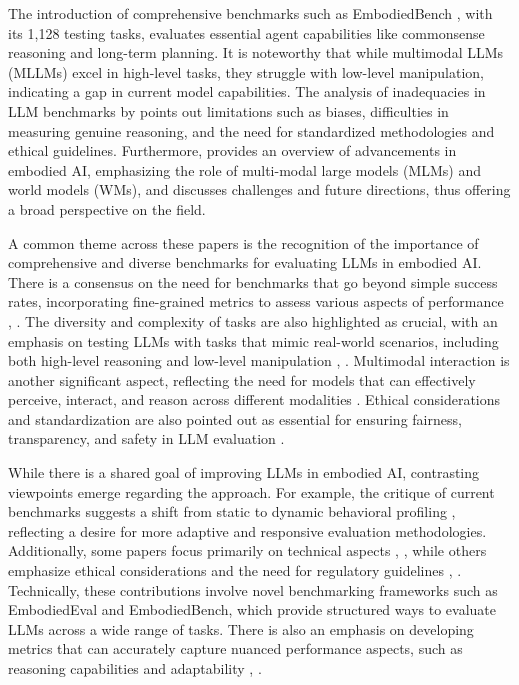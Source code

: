 \documentclass[conference]{IEEEtran}
\begin{document}
The introduction of comprehensive benchmarks such as EmbodiedBench \cite{b4}, with its 1,128 testing tasks, evaluates essential agent capabilities like commonsense reasoning and long-term planning. It is noteworthy that while multimodal LLMs (MLLMs) excel in high-level tasks, they struggle with low-level manipulation, indicating a gap in current model capabilities. The analysis of inadequacies in LLM benchmarks by \cite{b5} points out limitations such as biases, difficulties in measuring genuine reasoning, and the need for standardized methodologies and ethical guidelines. Furthermore, \cite{b6} provides an overview of advancements in embodied AI, emphasizing the role of multi-modal large models (MLMs) and world models (WMs), and discusses challenges and future directions, thus offering a broad perspective on the field.

A common theme across these papers is the recognition of the importance of comprehensive and diverse benchmarks for evaluating LLMs in embodied AI. There is a consensus on the need for benchmarks that go beyond simple success rates, incorporating fine-grained metrics to assess various aspects of performance \cite{b1}, \cite{b2}. The diversity and complexity of tasks are also highlighted as crucial, with an emphasis on testing LLMs with tasks that mimic real-world scenarios, including both high-level reasoning and low-level manipulation \cite{b3}, \cite{b4}. Multimodal interaction is another significant aspect, reflecting the need for models that can effectively perceive, interact, and reason across different modalities \cite{b5}. Ethical considerations and standardization are also pointed out as essential for ensuring fairness, transparency, and safety in LLM evaluation \cite{b6}.

While there is a shared goal of improving LLMs in embodied AI, contrasting viewpoints emerge regarding the approach. For example, the critique of current benchmarks suggests a shift from static to dynamic behavioral profiling \cite{b7}, reflecting a desire for more adaptive and responsive evaluation methodologies. Additionally, some papers focus primarily on technical aspects \cite{b1}, \cite{b2}, while others emphasize ethical considerations and the need for regulatory guidelines \cite{b5}, \cite{b6}. Technically, these contributions involve novel benchmarking frameworks such as EmbodiedEval and EmbodiedBench, which provide structured ways to evaluate LLMs across a wide range of tasks. There is also an emphasis on developing metrics that can accurately capture nuanced performance aspects, such as reasoning capabilities and adaptability \cite{b3}, \cite{b4}.
\end{document}
